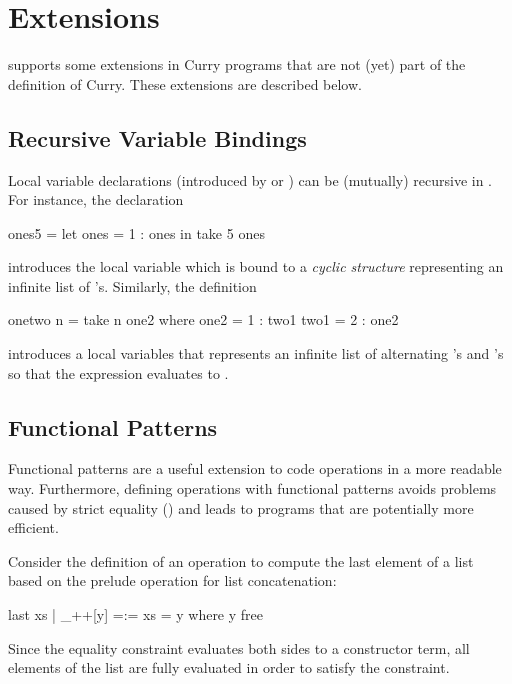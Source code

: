 \section{Extensions}
\label{sec-extensions}

\CYS supports some extensions in Curry programs that are not (yet)
part of the definition of Curry. These extensions are described below.

\subsection{Recursive Variable Bindings}

Local variable declarations (introduced by 
or ) can be (mutually) recursive in \CYS.
For instance, the declaration
\begin{curry}
ones5 = let ones = 1 : ones
         in take 5 ones
\end{curry}
introduces the local variable  which is bound
to a \emph{cyclic structure}
representing an infinite list of 's.
Similarly, the definition
\begin{curry}
onetwo n = take n one2
 where
   one2 = 1 : two1
   two1 = 2 : one2
\end{curry}
introduces a local variables  that represents
an infinite list of alternating 's and 's
so that the expression  evaluates to \code{[1,2,1,2,1,2]}.


\subsection{Functional Patterns}

Functional patterns \cite{AntoyHanus05LOPSTR} are a useful extension
to code operations in a more readable way. Furthermore,
defining operations with functional patterns avoids problems
caused by strict equality (\ccode{=:=}) and leads to programs
that are potentially more efficient.

Consider the definition of an operation to compute the last element
of a list  based on the prelude operation \ccode{++}
for list concatenation:
\begin{curry}
last xs | _++[y] =:= xs  = y   where y free
\end{curry}
Since the equality constraint \ccode{=:=} evaluates both sides
to a constructor term, all elements of the list  are
fully evaluated in order to satisfy the constraint.

